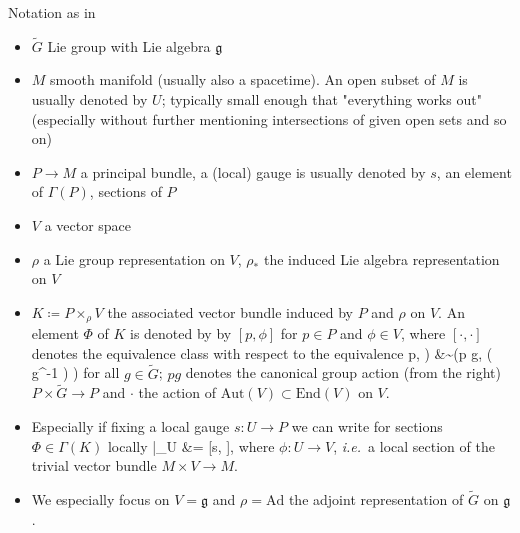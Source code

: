 \documentclass[a4paper,oneside,11pt,bibliography=totoc]{scrartcl}
\def\ba#1\ea{\begin{align}#1\end{align}}
\def\bas#1\eas{\begin{align*}#1\end{align*}}
\theoremstyle{plain}
\theoremstyle{remark}
\theoremstyle{definition}
\begin{document}
%
%

Notation as in \cite{Hamilton}

\begin{itemize}
	\item $\widetilde{G}$ Lie group with Lie algebra $\mathfrak{g}$
	\item $M$ smooth manifold (usually also a spacetime). An open subset of $M$ is usually denoted by $U$; typically small enough that "everything works out" (especially without further mentioning intersections of given open sets and so on)
	\item $P \to M$ a principal bundle, a (local) gauge is usually denoted by $s$, an element of $\Gamma(P)$, sections of $P$
	\item $V$ a vector space
	\item $\rho$ a Lie group representation on $V$, $\rho_*$ the induced Lie algebra representation on $V$
	\item $K \coloneqq P \times_\rho V$ the associated vector bundle induced by $P$ and $\rho$ on $V$. An element $\Phi$ of $K$ is denoted by by $[p, \phi]$ for $p \in P$ and $\phi \in V$, where $[ \cdot, \cdot]$ denotes the equivalence class with respect to the equivalence
	\bas
		(p, \phi) &\sim \mleft(p g, \rho\mleft( g^{-1} \mright) \cdot \phi \mright)
	\eas
	for all $g \in \widetilde{G}$; $pg$ denotes the canonical group action (from the right) $P \times \widetilde{G} \to P$ and $\cdot$ the action of $\mathrm{Aut}(V) \subset \mathrm{End}(V)$ on $V$.
	\item Especially if fixing a local gauge $s: U \to P$ we can write for sections $\Phi \in \Gamma(K)$ locally 
	\bas
		\Phi|_U
		&=
		[s, \phi],
	\eas
	where $\phi: U \to V$, \textit{i.e.}\ a local section of the trivial vector bundle $M \times V \to M$.
	\item We especially focus on $V = \mathfrak{g}$ and $\rho = \mathrm{Ad}$ the adjoint representation of $\widetilde{G}$ on $\mathfrak{g}$.
\end{itemize}
\end{document}
